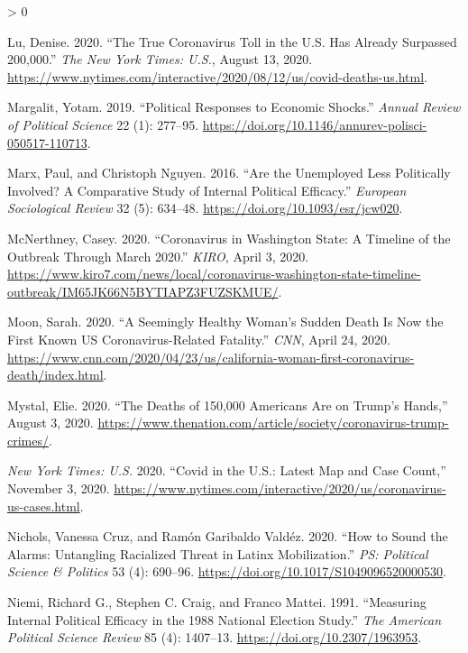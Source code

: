 \documentclass[
  12pt,
]{article}
\newlength{\cslhangindent}
\newenvironment{CSLReferences}[2] %
 {%
  \setlength{\parindent}{0pt}
  \ifodd #1 \everypar{\setlength{\hangindent}{\cslhangindent}}\ignorespaces\fi
  \ifnum #2 > 0
  \setlength{\parskip}{#2\baselineskip}
  \fi
 }%
 {}
\begin{document}
\begin{CSLReferences}{1}{0}
\leavevmode\hypertarget{ref-Lu2020}{}%
Lu, Denise. 2020. {``The {True Coronavirus Toll} in the {U}.{S}. {Has Already Surpassed} 200,000.''} \emph{The New York Times: U.S.}, August 13, 2020. \url{https://www.nytimes.com/interactive/2020/08/12/us/covid-deaths-us.html}.

\leavevmode\hypertarget{ref-Margalit2019}{}%
Margalit, Yotam. 2019. {``Political {Responses} to {Economic Shocks}.''} \emph{Annual Review of Political Science} 22 (1): 277--95. \url{https://doi.org/10.1146/annurev-polisci-050517-110713}.

\leavevmode\hypertarget{ref-Marx2016}{}%
Marx, Paul, and Christoph Nguyen. 2016. {``Are the {Unemployed Less Politically Involved}? {A Comparative Study} of {Internal Political Efficacy}.''} \emph{European Sociological Review} 32 (5): 634--48. \url{https://doi.org/10.1093/esr/jcw020}.

\leavevmode\hypertarget{ref-McNerthney2020}{}%
McNerthney, Casey. 2020. {``Coronavirus in {Washington} State: {A} Timeline of the Outbreak Through {March} 2020.''} \emph{KIRO}, April 3, 2020. \url{https://www.kiro7.com/news/local/coronavirus-washington-state-timeline-outbreak/IM65JK66N5BYTIAPZ3FUZSKMUE/}.

\leavevmode\hypertarget{ref-Moon2020}{}%
Moon, Sarah. 2020. {``A Seemingly Healthy Woman's Sudden Death Is Now the First Known {US} Coronavirus-Related Fatality.''} \emph{CNN}, April 24, 2020. \url{https://www.cnn.com/2020/04/23/us/california-woman-first-coronavirus-death/index.html}.

\leavevmode\hypertarget{ref-Mystal2020}{}%
Mystal, Elie. 2020. {``The {Deaths} of 150,000 {Americans Are} on {Trump}'s {Hands},''} August 3, 2020. \url{https://www.thenation.com/article/society/coronavirus-trump-crimes/}.

\leavevmode\hypertarget{ref-nyt2020}{}%
\emph{New York Times: U.S.} 2020. {``Covid in the {U}.{S}.: {Latest Map} and {Case Count},''} November 3, 2020. \url{https://www.nytimes.com/interactive/2020/us/coronavirus-us-cases.html}.

\leavevmode\hypertarget{ref-Nichols2020a}{}%
Nichols, Vanessa Cruz, and Ramón Garibaldo Valdéz. 2020. {``How to {Sound} the {Alarms}: {Untangling Racialized Threat} in {Latinx Mobilization}.''} \emph{PS: Political Science \& Politics} 53 (4): 690--96. \url{https://doi.org/10.1017/S1049096520000530}.

\leavevmode\hypertarget{ref-Niemi1991}{}%
Niemi, Richard G., Stephen C. Craig, and Franco Mattei. 1991. {``Measuring {Internal Political Efficacy} in the 1988 {National Election Study}.''} \emph{The American Political Science Review} 85 (4): 1407--13. \url{https://doi.org/10.2307/1963953}.


\end{CSLReferences}
\end{document}
